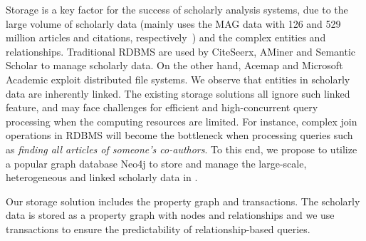 Storage is a key factor for the success of scholarly analysis systems, due to the large volume of scholarly data (\eg \oursystem mainly uses the MAG data with 126 and 529 million articles and citations, respectively~\cite{sinha2015overview}) and the complex entities and relationships.
%
Traditional RDBMS are used by CiteSeerx, AMiner and Semantic Scholar to manage scholarly data. On the other hand, Acemap and Microsoft Academic exploit distributed file systems.
%
We observe that entities in scholarly data are inherently linked. The existing storage solutions all ignore such linked feature, and may face challenges for efficient and high-concurrent query processing when the computing resources are limited. For instance, complex join operations in RDBMS will become the bottleneck when processing queries such as {\em finding all articles of someone's co-authors}.
%
To this end, we propose to utilize a popular graph database Neo4j to store and manage the large-scale, heterogeneous and linked scholarly data in \oursystem.



Our storage solution includes the property graph and transactions. The scholarly data is stored as a property graph with nodes and relationships and we use transactions to ensure the predictability of relationship-based queries. 





